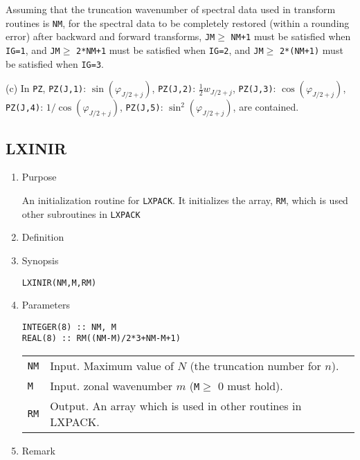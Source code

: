\documentclass[a4paper]{scrartcl}
\begin{document}
\begin{enumerate}
Assuming that the truncation wavenumber of spectral data
used in transform routines is \texttt{NM},
for the spectral data to be completely restored (within a rounding
error) after backward and forward transforms,
\texttt{JM}$\ge$ \texttt{NM+1} must be satisfied when
\texttt{IG=1}, and
\texttt{JM}$\ge$ \texttt{2*NM+1} must be satisfied 
when \texttt{IG=2},
and
\texttt{JM}$\ge$ \texttt{2*(NM+1)} must be satisfied 
when \texttt{IG=3}.

(c) In \texttt{PZ}, 
   \texttt{PZ(J,1)}:  $\sin(\varphi_{J/2+j})$,
   \texttt{PZ(J,2)}:  $\frac12 w_{J/2+j}$, 
   \texttt{PZ(J,3)}:  $\cos(\varphi_{J/2+j})$,
   \texttt{PZ(J,4)}:  $1/\cos(\varphi_{J/2+j})$,
   \texttt{PZ(J,5)}:  $\sin^2(\varphi_{J/2+j})$,   
are contained.

\end{enumerate}

\subsection{LXINIR}

\begin{enumerate}

\item Purpose

An initialization routine for \texttt{LXPACK}.  
It initializes the array, \texttt{RM},
which is used other subroutines in \texttt{LXPACK}

\item Definition

\item Synopsis 
    
\texttt{LXINIR(NM,M,RM)}
  
\item Parameters 

\begin{verbatim}
INTEGER(8) :: NM, M
REAL(8) :: RM((NM-M)/2*3+NM-M+1)
\end{verbatim}
      
\begin{tabular}{ll}
\texttt{NM} & Input. Maximum value of $N$ (the truncation 
  number for $n$).\\
\texttt{M} & Input. zonal wavenumber $m$ 
(\texttt{M}$\ge$ 0 must hold).\\
\texttt{RM}  & Output. An array which is used in other routines in LXPACK.\\
\end{tabular}

\item Remark

\end{enumerate}
\end{document}
